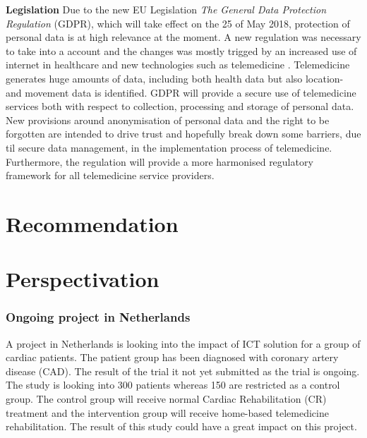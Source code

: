 \textbf{Legislation} \newline
Due to the new EU Legislation \textit{The General Data Protection Regulation} (GDPR), which will take effect on the 25 of May 2018, protection of personal data is at high relevance at the moment. A new regulation was necessary to take into a account and the changes was mostly trigged by an increased use of internet in healthcare and new technologies such as telemedicine \cite{GDPR}. Telemedicine generates huge amounts of data, including both health data but also location- and movement data is identified. GDPR will provide a secure use of telemedicine services both with respect to collection, processing and storage of personal data. New provisions around anonymisation of personal data and the right to be forgotten are intended to drive trust and hopefully break down some barriers, due til secure data management, in the implementation process of telemedicine. Furthermore, the regulation will provide a more harmonised regulatory framework for all telemedicine service providers.   







\chapter{Recommendation}

\chapter{Perspectivation}
\subsection{Ongoing project in Netherlands}

A project in Netherlands is looking into the impact of ICT solution for a group of cardiac patients. The patient group has been diagnosed with coronary artery disease (CAD). The result of the trial it not yet submitted as the trial is ongoing. The study is looking into 300 patients whereas 150 are restricted as a control group. The control group will receive normal Cardiac Rehabilitation (CR) treatment and the intervention group will receive home-based telemedicine rehabilitation\cite{CAD}. 
The result of this study could have a great impact on this project.
